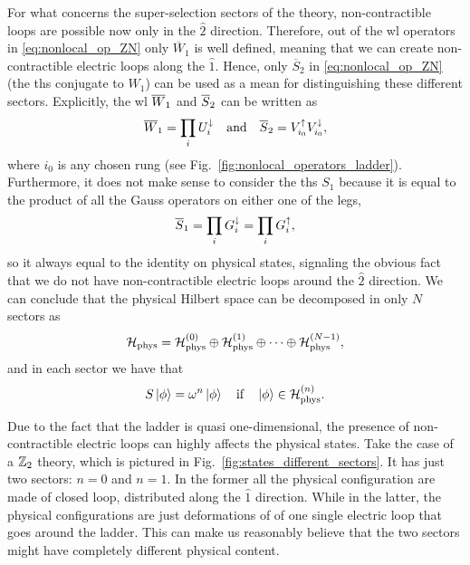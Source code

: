 For what concerns the super-selection sectors of the theory,
non-contractible loops are possible now only in the $\hat{2}$ direction.
Therefore, out of the \ac{wl} operators in \eqref{eq:nonlocal_op_ZN} only $\overline{W}_1$ is well defined, meaning that we can create non-contractible electric loops along the $\hat{1}$.
Hence, only $\overline{S}_2$ in \eqref{eq:nonlocal_op_ZN} (the \ac{ths} conjugate to $W_1$) can be used as a mean for distinguishing these different sectors.
Explicitly, the \ac{wl} $\overline{W}_1$ and $\overline{S}_2$ can be written as
\begin{equation}
    \Wilson_1 = \prod_{i} \Udown_i \qand
    \tHooft_2 = \Vup_{i_0} \Vdown_{i_0},
\end{equation}
where $i_0$ is any chosen rung (see Fig.~\ref{fig:nonlocal_operators_ladder}).
Furthermore, it does not make sense to consider the \ac{ths} $S_1$ because it is equal to the product of all the Gauss operators on either one of the legs,
\begin{equation}
    \overline{S}_1 = \prod_{i} G^{\downarrow}_i = \prod_{i} G^{\uparrow}_i,
\end{equation}
so it always equal to the identity on physical states, signaling the obvious fact that we do not have non-contractible electric loops around the $\hat{2}$ direction.
We can conclude that the physical Hilbert space can be decomposed in only $N$ sectors as
\begin{equation}
    \mathcal{H}_{\text{phys}} = \mathcal{H}_{\text{phys}}^{(0)} \oplus \mathcal{H}_{\text{phys}}^{(1)} \oplus \dots \oplus \mathcal{H}_{\text{phys}}^{(N-1)},
\end{equation}
and in each sector we have that
\begin{equation}
    S \ket{\phi} = \omega^n \ket{\phi} \quad \text{if} \quad \ket{\phi} \in \mathcal{H}_{\text{phys}}^{(n)}.
\end{equation}

\begin{figure}[t]
\end{figure}


Due to the fact that the ladder is quasi one-dimensional, the presence of non-contractible electric loops can highly affects the physical states.
Take the case of a $\mathbb{Z}_2$ theory, which is pictured in Fig.~\ref{fig:states_different_sectors}.
It has just two sectors: $n=0$ and $n=1$.
In the former all the physical configuration are made of closed loop, distributed along the $\hat{1}$ direction.
While in the latter, the physical configurations are just deformations of of one single electric loop that goes around the ladder.
This can make us reasonably believe that the two sectors might have completely different physical content.


